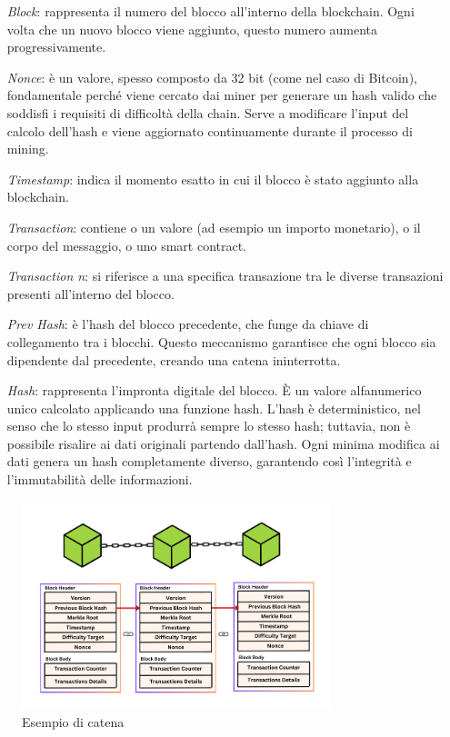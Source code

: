 \begin{itemize}
    \item[\textit{Block}:]  rappresenta il numero del blocco all'interno della blockchain. Ogni volta che un nuovo blocco viene aggiunto, questo numero aumenta progressivamente.
    \item[\textit{Nonce}:]  è un valore, spesso composto da 32 bit (come nel caso di Bitcoin), fondamentale perché viene cercato dai miner per generare un hash valido che soddisfi i requisiti di difficoltà della chain. Serve a modificare l’input del calcolo dell’hash e viene aggiornato continuamente durante il processo di mining.
    \item [\textit{Timestamp}:] indica il momento esatto in cui il blocco è stato aggiunto alla blockchain.
    \item [\textit{Transaction}:] contiene o un valore (ad esempio un importo monetario), o il corpo del messaggio, o uno smart contract.
    \item [\textit{Transaction n}:] si riferisce a una specifica transazione tra le diverse transazioni presenti all’interno del blocco.
    \item [\textit{Prev Hash}:] è l’hash del blocco precedente, che funge da chiave di collegamento tra i blocchi. Questo meccanismo garantisce che ogni blocco sia dipendente dal precedente, creando una catena ininterrotta.
    \item [\textit{Hash}:] rappresenta l’impronta digitale del blocco. È un valore alfanumerico unico calcolato applicando una funzione hash. L’hash è deterministico, nel senso che lo stesso input produrrà sempre lo stesso hash; tuttavia, non è possibile risalire ai dati originali partendo dall’hash. Ogni minima modifica ai dati genera un hash completamente diverso, garantendo così l’integrità e l’immutabilità delle informazioni.
\end{itemize}
\begin{figure}[t]
    \centering
    \includegraphics[width=0.8\textwidth]{Immagini/structure of block.png}
    \caption{Esempio di catena}
\end{figure}
